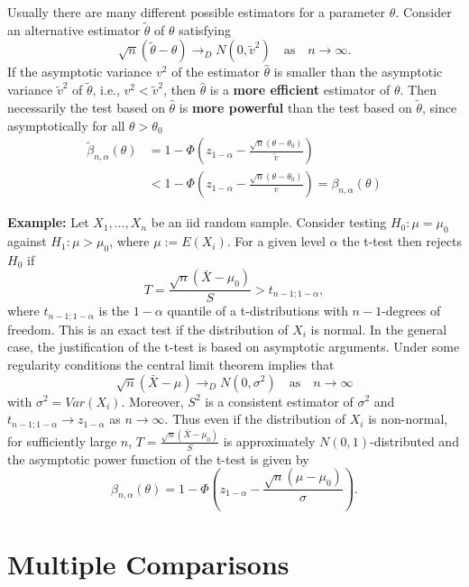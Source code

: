 \documentclass[
]{book}
\begin{document}
\hfill\break

Usually there are many different possible estimators for a parameter \(\theta\). Consider an alternative estimator \(\tilde\theta\) of \(\theta\) satisfying
\[
\sqrt{n}(\tilde\theta - \theta)\rightarrow_D N(0,\tilde v^2) \quad\text{as}\quad n\rightarrow\infty.
\]
If the asymptotic variance \(v^2\) of the estimator \(\hat\theta\) is smaller than the asymptotic variance \(\tilde v^2\) of \(\tilde\theta\), i.e., \(v^2<\tilde v^2\), then \(\hat\theta\) is a \textbf{more efficient} estimator of \(\theta\). Then necessarily the test based on \(\hat\theta\) is \textbf{more powerful} than the test based on \(\tilde\theta\), since asymptotically for all \(\theta>\theta_0\)
\begin{align*}
\tilde\beta_{n,\alpha}(\theta) &= 1-\Phi\left(z_{1-\alpha}-\frac{\sqrt{n} (\theta -\theta_0)}{\tilde v}\right)\\
& < 1-\Phi\left(z_{1-\alpha}-\frac{\sqrt{n} (\theta -\theta_0)}{v}\right)=\beta_{n,\alpha}(\theta)
\end{align*}

\hfill\break

\textbf{Example:} Let \(X_1,\dots,X_n\) be an iid random sample. Consider testing \(H_0:\mu=\mu_0\) against \(H_1:\mu>\mu_0\), where \(\mu:=E(X_i)\). For a given level \(\alpha\) the t-test then rejects \(H_0\) if
\[
T=\frac{\sqrt{n}(\bar X-\mu_0)}{S}>t_{n-1;1-\alpha},
\]
where \(t_{n-1;1-\alpha}\) is the \(1-\alpha\) quantile of a t-distributions with \(n-1\)-degrees of freedom. This is an exact test if the distribution of \(X_i\) is normal. In the general case, the justification of the t-test is based on asymptotic arguments. Under some regularity conditions the central limit theorem implies that
\[
\sqrt{n}(\bar X - \mu)\rightarrow_D N(0,\sigma^2)\quad\text{as}\quad n\rightarrow\infty
\]
with \(\sigma^2=Var(X_i)\). Moreover, \(S^2\) is a consistent estimator of \(\sigma^2\) and \(t_{n-1;1-\alpha}\rightarrow z_{1-\alpha}\) as \(n\rightarrow \infty\). Thus even if the distribution of \(X_i\) is non-normal, for sufficiently large \(n\), \(T=\frac{\sqrt{n}(\bar X-\mu_0)}{S}\) is approximately \(N(0,1)\)-distributed and the asymptotic power function of the t-test is given by
\[
\beta_{n,\alpha}(\theta) = 1-\Phi\left(z_{1-\alpha}-\frac{\sqrt{n} (\mu -\mu_0)}{\sigma}\right).
\]

\hypertarget{multiple-comparisons}{%
\section{Multiple Comparisons}\label{multiple-comparisons}}
\end{document}

